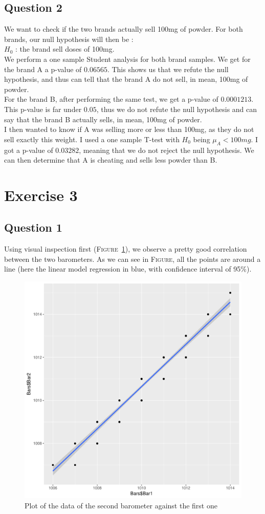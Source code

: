 \documentclass[12pt,a4paper]{article}
\begin{document}
\subsection*{Question 2}
We want to check if the two brands actually sell 100mg of powder. For both brands, our null hypothesis will then be :\\
$H_0$ : the brand sell doses of 100mg.\\
We perform a one sample Student analysis for both brand samples. We get for the brand A a p-value of $0.06565$. This shows us that we refute the null hypothesis, and thus can tell that the brand A do not sell, in mean, 100mg of powder.\\
For the brand B, after performing the same test, we get a p-value of $0.0001213$. This p-value is far under $0.05$, thus we do not refute the null hypothesis and can say that the brand B actually sells, in mean, 100mg of powder.\\

I then wanted to know if A was selling more or less than 100mg, as they do not sell exactly this weight. I used a one sample T-test with $H_0$ being $\mu_A < 100mg$. I got a p-value of $0.03282$, meaning that we do not reject the null hypothesis. We can then determine that A is cheating and sells less powder than B.

\section*{Exercise 3}
\subsection*{Question 1}
Using visual inspection first (\textsc{Figure}~\ref{corr3}), we observe a pretty good correlation between the two barometers. As we can see in \textsc{Figure}, all the points are around a line (here the linear model regression in blue, with confidence interval of 95\%).\\

\begin{figure}
  \begin{center}
    \includegraphics[width=0.6\linewidth]{corr3.pdf}
    \caption{Plot of the data of the second barometer against the first one}
    \label{corr3}
  \end{center}
\end{figure}
\end{document}
